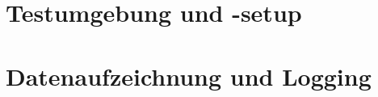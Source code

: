 







\section{Testumgebung und -setup}
\label{sec:testumgebung}


\section{Datenaufzeichnung und Logging}
\label{sec:logging}


